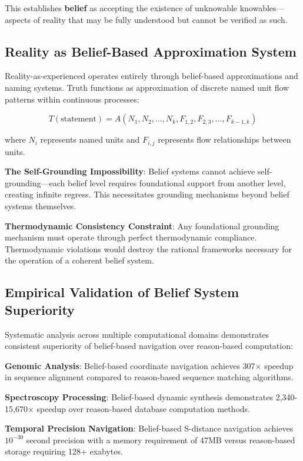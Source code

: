 \documentclass[12pt,a4paper]{article}
\begin{document}
This establishes \textbf{belief} as accepting the existence of unknowable knowables—aspects of reality that may be fully understood but cannot be verified as such.

\subsection{Reality as Belief-Based Approximation System}

Reality-as-experienced operates entirely through belief-based approximations and naming systems. Truth functions as approximation of discrete named unit flow patterns within continuous processes:

\begin{equation}
T(\text{statement}) = A(N_1, N_2, \ldots, N_k, F_{1,2}, F_{2,3}, \ldots, F_{k-1,k})
\end{equation}

where $N_i$ represents named units and $F_{i,j}$ represents flow relationships between units.

\textbf{The Self-Grounding Impossibility}: Belief systems cannot achieve self-grounding—each belief level requires foundational support from another level, creating infinite regress. This necessitates grounding mechanisms beyond belief systems themselves.

\textbf{Thermodynamic Consistency Constraint}: Any foundational grounding mechanism must operate through perfect thermodynamic compliance. Thermodynamic violations would destroy the rational frameworks necessary for the operation of a coherent belief system.

\subsection{Empirical Validation of Belief System Superiority}

Systematic analysis across multiple computational domains demonstrates consistent superiority of belief-based navigation over reason-based computation:

\textbf{Genomic Analysis}: Belief-based coordinate navigation achieves 307$\times$ speedup in sequence alignment compared to reason-based sequence matching algorithms.

\textbf{Spectroscopy Processing}: Belief-based dynamic synthesis demonstrates 2,340-15,670$\times$ speedup over reason-based database computation methods.

\textbf{Temporal Precision Navigation}: Belief-based S-distance navigation achieves $10^{-30}$ second precision with a memory requirement of 47MB versus reason-based storage requiring 128+ exabytes.
\end{document}
